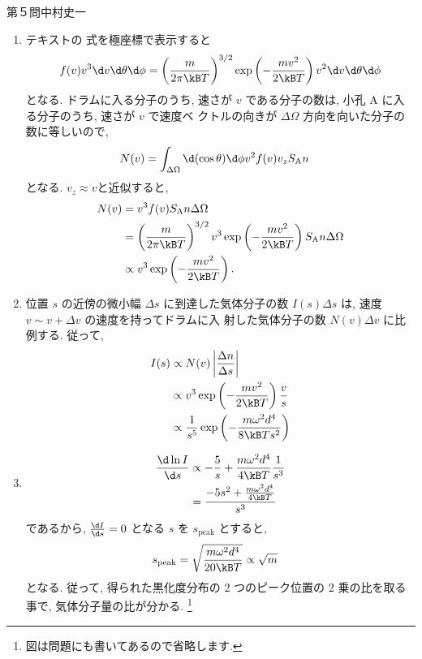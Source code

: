 \begin{answer}{第５問}{中村史一}
\begin{enumerate}
  \begin{align}
    \frac{\d s}{\d v} = -\frac{\omega d^2}{2 v^2} = -\frac{s}{v}
  \end{align}
  であるから,
  \begin{align}
    \frac{\Delta s}s = - \frac{\Delta v}v.
  \end{align}
\item
  テキストの  式を極座標で表示すると
  \begin{align}
    f(v) v^3 \d v\d\theta\d\phi = \left(\frac{m}{2\pi\kB T}\right)^{3/2} \exp\left(-\frac{mv^2}{2\kB T}\right) v^2 \d v\d\theta\d\phi
  \end{align}
  となる. ドラムに入る分子のうち, 速さが $v$ である分子の数は, 小孔 A に入る分子のうち, 速さが $v$ で速度ベ
  クトルの向きが $\Delta\Omega$ 方向を向いた分子の数に等しいので,
  \begin{align}
    N(v) &= \int_{\Delta\Omega} \d(\cos\theta)\d\phi v^2 f(v) v_z S_\mathrm{A} n
  \end{align}
  となる. $v_z\approx v$と近似すると,
  \begin{align}
    N(v) &= v^3 f(v) S_\mathrm{A} n \Delta\Omega \nonumber\\
    &= \left(\frac{m}{2\pi\kB T}\right)^{3/2} v^3 \exp\left(-\frac{mv^2}{2\kB T}\right) S_\mathrm{A} n \Delta\Omega \nonumber\\
    &\propto v^3\exp\left(-\frac{mv^2}{2\kB T}\right).
  \end{align}
\item
  位置 $s$ の近傍の微小幅 $\Delta s$ に到達した気体分子の数 $I(s)\Delta s$ は, 速度 $v\sim v+\Delta v$ の速度を持ってドラムに入
  射した気体分子の数 $N(v)\Delta v$ に比例する. 従って,
  \begin{align}
    I(s)
    &\propto N(v)\left|\frac{\Delta n}{\Delta s}\right| \nonumber\\
    &\propto v^3\exp\left(-\frac{mv^2}{2\kB T}\right) \frac vs \nonumber\\
    &\propto \frac1{s^5}\exp\left(-\frac{m\omega^2d^4}{8\kB Ts^2}\right)
  \end{align}
\item
  \begin{align}
    \frac{\d\ln I}{\d s}
    &\propto -\frac 5s + \frac{m\omega^2d^4}{4\kB T} \frac1{s^3} \nonumber\\
    &= \frac{-5s^2+\frac{m\omega^2d^4}{4\kB T}}{s^3} \nonumber\\
  \end{align}
  であるから, $\frac{\d I}{\d s} = 0$ となる $s$ を $s_\mathrm{peak}$ とすると,
  \begin{align}
    s_\mathrm{peak} &= \sqrt{\frac{m\omega^2d^4}{20\kB T}} \propto \sqrt{m}
  \end{align}
  となる. 従って, 得られた黒化度分布の 2 つのピーク位置の 2 乗の比を取る事で, 気体分子量の比が分かる.
  \footnote{図は問題にも書いてあるので省略します. }
\end{enumerate}
\end{answer}

